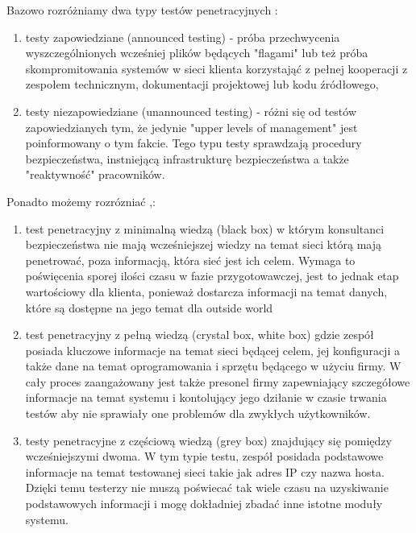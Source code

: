 Bazowo rozróżniamy dwa typy testów penetracyjnych \cite{Klev04}:
\begin{enumerate}
\item testy zapowiedziane (announced testing) - próba przechwycenia wyszczególnionych wcześniej plików będących "flagami" lub też próba skompromitowania systemów w sieci klienta korzystająć z pełnej kooperacji z zespołem technicznym, dokumentacji projektowej lub kodu źródłowego,

\item testy niezapowiedziane (unannounced testing) - różni się od testów zapowiedzianych tym, że jedynie "upper levels of management" jest poinformowany o tym fakcie. Tego typu testy sprawdzają procedury bezpieczeństwa, instniejącą infrastrukturę bezpieczeństwa a także "reaktywność" pracowników.
\end{enumerate}

Ponadto możemy rozrózniać \cite{Geer02},\cite{Messier2016}:
\begin{enumerate}
\item test penetracyjny z minimalną wiedzą (black box) w którym konsultanci bezpieczeństwa nie mają wcześniejszej wiedzy na temat sieci którą mają penetrować, poza informacją, która sieć jest ich celem. Wymaga to poświęcenia sporej ilości czasu w fazie przygotowawczej, jest to jednak etap wartościowy dla klienta, ponieważ dostarcza informacji na temat danych, które są dostępne na jego temat dla outside world %

\item test penetracyjny z pełną wiedzą (crystal box, white box) gdzie zespół posiada kluczowe informacje na temat sieci będącej celem, jej konfiguracji a także dane na temat oprogramowania i sprzętu będącego w użyciu firmy. W cały proces zaangażowany jest także presonel firmy zapewniający szczegółowe informacje na temat systemu i kontolujący jego dziłanie w czasie trwania testów aby nie sprawiały one problemów dla zwykłych użytkowników. %

\item testy penetracyjne z częściową wiedzą (grey box) znajdujący się pomiędzy wcześniejszymi dwoma. W tym typie testu, zespół posidada podstawowe informacje na temat testowanej sieci takie jak adres IP czy nazwa hosta. Dzięki temu testerzy nie muszą poświecać tak wiele czasu na uzyskiwanie podstawowych informacji i mogę dokładniej zbadać inne istotne moduły systemu.
\end{enumerate}

